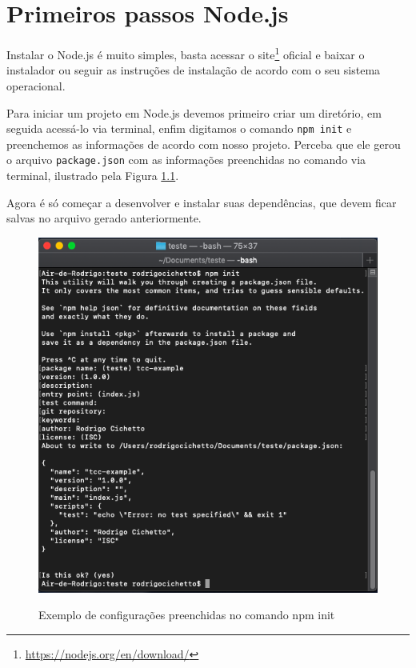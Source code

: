 \documentclass[
	12pt,				%
	openright,			%
	twoside,			%
	a4paper,			%
	english,			%
	brazil				%
	]{abntex2}
\begin{document}
\begin{anexosenv}
\begin{figure}[h]
\end{figure}

\chapter {Primeiros passos Node.js}
\label{anexo:NodePrimeirosPassos}

Instalar o Node.js é muito simples, basta acessar o site\footnote{\url{https://nodejs.org/en/download/}} oficial e baixar o instalador ou seguir as instruções de instalação de acordo com o seu sistema operacional.

Para iniciar um projeto em Node.js devemos primeiro criar um diretório, em seguida acessá-lo via terminal, enfim digitamos o comando \verb|npm init| e preenchemos as informações de acordo com nosso projeto. Perceba que ele gerou o arquivo \verb|package.json| com as informações preenchidas no comando via terminal, ilustrado pela Figura \ref{fig:NpmInitExample}.

Agora é só começar a desenvolver e instalar suas dependências, que devem ficar salvas no arquivo gerado anteriormente.

\begin{figure}[h]
	\centering

  \caption{Exemplo de configurações preenchidas no comando npm init} \label{fig:NpmInitExample}
    \includegraphics[scale=0.5]{npm-init-example} \\


\end{figure}
\end{anexosenv}
\end{document}
